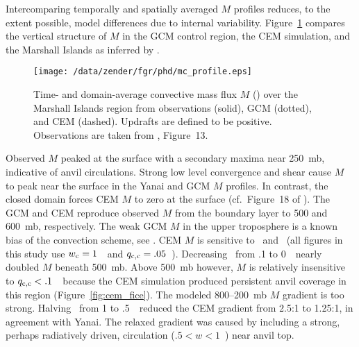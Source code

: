 \documentclass[twoside,agums]{aguplus}
\begin{document}
Intercomparing temporally and spatially averaged $M$ profiles
reduces, to the extent possible, model differences due to internal
variability.  
Figure~\ref{fig:mc_profile} compares the vertical structure of $M$ in
the GCM control region, the CEM simulation, and the Marshall Islands
as inferred by \cite{YEC73}.  
\begin{figure}
\begin{center}
\texttt{[image: /data/zender/fgr/phd/mc\_profile.eps]}
\end{center}
\caption[Time- and domain-average convective mass flux $M$ over the
Marshall Islands region from observations, GCM, and CEM]{
Time- and domain-average convective mass flux $M$ (\mbxh) over the
Marshall Islands region from observations (solid), GCM (dotted), and  
CEM (dashed).
Updrafts are defined to be positive.
Observations are taken from \cite{YEC73},
Figure~13.\label{fig:mc_profile}}
\end{figure}
Observed $M$ peaked at the surface with a secondary maxima near
250~mb, indicative of anvil circulations.
Strong low level convergence and shear cause $M$ to peak near the
surface in the Yanai and GCM $M$ profiles. 
In contrast, the closed domain forces CEM $M$ to zero at the surface 
(cf.\ Figure~18 of \cite{SLT94}). 
The GCM and CEM reproduce observed $M$ from the boundary layer to
500 and 600~mb, respectively. 
The weak GCM $M$ in the upper troposphere is a known bias of the
convection scheme, see \cite{MRP95}.
CEM $M$ is sensitive to \wc\ and \qcc\ (all figures in this study use
$\mbox{$w_\mathrm{c}$} = 1$~\mxs\ and $\mbox{$q_\mathrm{c,c}$} = .05$~\gxkg). 
Decreasing \qcc\ from .1 to 0~\gxkg\ nearly doubled $M$ beneath
500~mb. 
Above 500~mb however, $M$ is relatively insensitive to $\mbox{$q_\mathrm{c,c}$} <
.1$~\gxkg\ because the CEM simulation produced persistent anvil
coverage in this region (Figure~\ref{fig:cem_fice}). 
The modeled 800--200~mb $M$ gradient is too strong.
Halving \wc\ from 1 to .5~\mxs\ reduced the CEM gradient from 2.5:1 to 
1.25:1, in agreement with Yanai.
The relaxed gradient was caused by including a strong, perhaps
radiatively driven, circulation ($.5 < w < 1$~\mxs) near anvil top.
\end{document}
